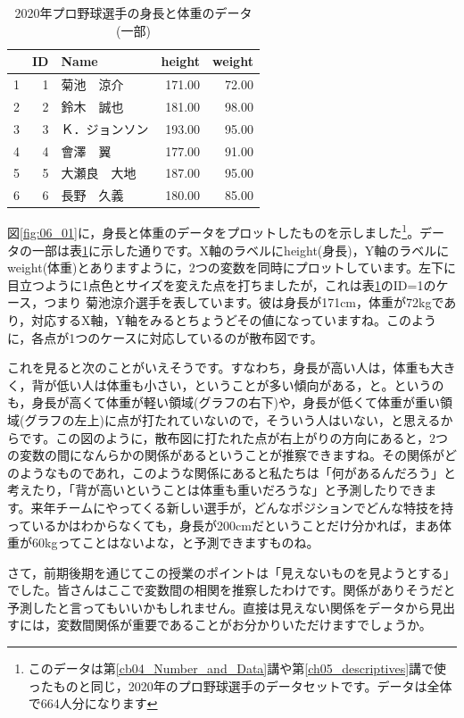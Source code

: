 \documentclass{ltjsbook}
\begin{document}
\begin{table}[ht]
\centering
\caption{2020年プロ野球選手の身長と体重のデータ(一部)}
\label{tbl:06_04}
\begin{tabular}{rrlrr}
  \hline
 & ID & Name & height & weight \\ 
  \hline
1 &   1 & 菊池　涼介 & 171.00 & 72.00 \\ 
  2 &   2 & 鈴木　誠也 & 181.00 & 98.00 \\ 
  3 &   3 & Ｋ．ジョンソン & 193.00 & 95.00 \\ 
  4 &   4 & 會澤　翼 & 177.00 & 91.00 \\ 
  5 &   5 & 大瀬良　大地 & 187.00 & 95.00 \\ 
  6 &   6 & 長野　久義 & 180.00 & 85.00 \\ 
   \hline
\end{tabular}
\end{table}

図\ref{fig:06_01}に，身長と体重のデータをプロットしたものを示しました\footnote{このデータは第\ref{cb04_Number_and_Data}講や第\ref{ch05_descriptives}講で使ったものと同じ，2020年のプロ野球選手のデータセットです。データは全体で664人分になります}。データの一部は表\ref{tbl:06_04}に示した通りです。X軸のラベルにheight(身長)，Y軸のラベルにweight(体重)とありますように，2つの変数を同時にプロットしています。左下に目立つように1点色とサイズを変えた点を打ちましたが，これは表\ref{tbl:06_04}のID=1のケース，つまり 菊池涼介選手を表しています。彼は身長が171cm，体重が72kgであり，対応するX軸，Y軸をみるとちょうどその値になっていますね。このように，各点が1つのケースに対応しているのが散布図です。

これを見ると次のことがいえそうです。すなわち，身長が高い人は，体重も大きく，背が低い人は体重も小さい，ということが多い傾向がある，と。というのも，身長が高くて体重が軽い領域(グラフの右下)や，身長が低くて体重が重い領域(グラフの左上)に点が打たれていないので，そういう人はいない，と思えるからです。この図のように，散布図に打たれた点が右上がりの方向にあると，2つの変数の間になんらかの関係があるということが推察できますね。その関係がどのようなものであれ，このような関係にあると私たちは「何があるんだろう」と考えたり，「背が高いということは体重も重いだろうな」と予測したりできます。来年チームにやってくる新しい選手が，どんなポジションでどんな特技を持っているかはわからなくても，身長が200cmだということだけ分かれば，まあ体重が60kgってことはないよな，と予測できますものね。

さて，前期後期を通じてこの授業のポイントは「見えないものを見ようとする」でした。皆さんはここで変数間の相関を推察したわけです。関係がありそうだと予測したと言ってもいいかもしれません。直接は見えない関係をデータから見出すには，変数間関係が重要であることがお分かりいただけますでしょうか。
\end{document}
